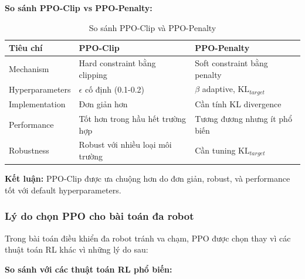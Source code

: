 \textbf{So sánh PPO-Clip vs PPO-Penalty:}

\begin{table}[ht]
\centering
\caption{So sánh PPO-Clip và PPO-Penalty}
\label{tab:ppo_comparison}
\begin{tabular}{|p{3cm}|p{5.5cm}|p{5.5cm}|}
\hline
\textbf{Tiêu chí} & \textbf{PPO-Clip} & \textbf{PPO-Penalty} \\
\hline
Mechanism & Hard constraint bằng clipping & Soft constraint bằng penalty \\
\hline
Hyperparameters & $\epsilon$ cố định (0.1-0.2) & $\beta$ adaptive, $\text{KL}_{target}$ \\
\hline
Implementation & Đơn giản hơn & Cần tính KL divergence \\
\hline
Performance & Tốt hơn trong hầu hết trường hợp & Tương đương nhưng ít phổ biến \\
\hline
Robustness & Robust với nhiều loại môi trường & Cần tuning $\text{KL}_{target}$ \\
\hline
\end{tabular}
\end{table}

\textbf{Kết luận:} PPO-Clip được ưa chuộng hơn do đơn giản, robust, và performance tốt với default hyperparameters.

\subsubsection{Lý do chọn PPO cho bài toán đa robot}

Trong bài toán điều khiển đa robot tránh va chạm, PPO được chọn thay vì các thuật toán RL khác vì những lý do sau:

\textbf{So sánh với các thuật toán RL phổ biến:}

